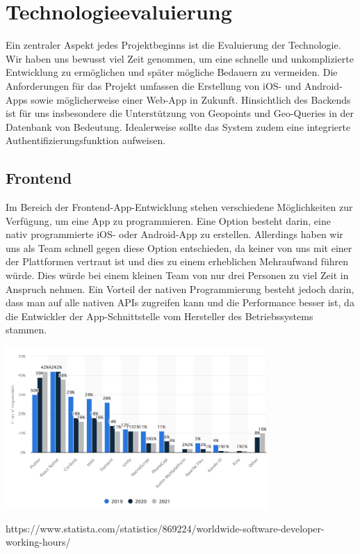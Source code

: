 \section{Technologieevaluierung}

Ein zentraler Aspekt jedes Projektbeginns ist die Evaluierung der Technologie. Wir haben uns bewusst viel Zeit genommen, um eine schnelle und unkomplizierte Entwicklung zu ermöglichen und später mögliche Bedauern zu vermeiden. Die Anforderungen für das Projekt umfassen die Erstellung von iOS- und Android-Apps sowie möglicherweise einer Web-App in Zukunft. Hinsichtlich des Backends ist für uns insbesondere die Unterstützung von Geopoints und Geo-Queries in der Datenbank von Bedeutung. Idealerweise sollte das System zudem eine integrierte Authentifizierungsfunktion aufweisen.


\subsection{Frontend}

Im Bereich der Frontend-App-Entwicklung stehen verschiedene Möglichkeiten zur Verfügung, um eine App zu programmieren. Eine Option besteht darin, eine nativ programmierte iOS- oder Android-App zu erstellen. Allerdings haben wir uns als Team schnell gegen diese Option entschieden, da keiner von uns mit einer der Plattformen vertraut ist und dies zu einem erheblichen Mehraufwand führen würde. Dies würde bei einem kleinen Team von nur drei Personen zu viel Zeit in Anspruch nehmen. Ein Vorteil der nativen Programmierung besteht jedoch darin, dass man auf alle nativen APIs zugreifen kann und die Performance besser ist, da die Entwickler der App-Schnittstelle vom Hersteller des Betriebssystems stammen.

\includegraphics[width=0.75\textwidth]{pics/cross-platform-statisitics.png}

https://www.statista.com/statistics/869224/worldwide-software-developer-working-hours/

